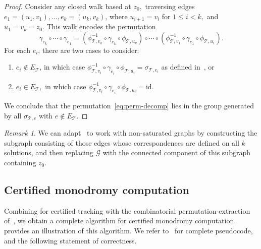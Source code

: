 \documentclass[11pt]{amsart}
\theoremstyle{definition}
\theoremstyle{remark}
\newtheorem{remark}[definition]{Remark}
\begin{document}
\begin{proof}
Consider any closed walk based at $z_0,$ traversing edges $e_1=(u_1, v_1), \dots , e_k=(u_k, v_k)$, where $u_{i+1}=v_i$ for $1\le i <k,$ and $u_1 = v_k = z_0.$
This walk encodes the permutation
\begin{equation}\label{eq:perm-decomp}
\gamma_{e_k} \circ \cdots \circ \gamma_{e_1} 
=
\left( 
\phi_{\mathcal{T},v_k}^{-1}\circ  \gamma_{e_k} \circ \phi_{\mathcal{T},u_k}
\right)
\circ \cdots 
\circ
\left( 
\phi_{\mathcal{T},v_1}^{-1}\circ  \gamma_{e_1}\circ  \phi_{\mathcal{T},u_1}
\right)
.
\end{equation}
For each $e_i$, there are two cases to consider:
\begin{enumerate}
    \item $e_i \notin E_\mathcal{T}$, in which case  $\phi_{\mathcal{T},v_i}^{-1}\circ  \gamma_{e_i} \circ \phi_{\mathcal{T},u_i}= \sigma_{\mathcal{T},e_i}$ as defined in~, or 
    
    \item $e_i\in E_\mathcal{T},$ in which case $\phi_{\mathcal{T},v_i}^{-1}\circ  \gamma_{e_i} \circ \phi_{\mathcal{T},u_i}=\text{id}.$
\end{enumerate}
We conclude that the permutation~\eqref{eq:perm-decomp} lies in the group generated by all $\sigma_{\mathcal{T},e}$ with $e\notin E_\mathcal{T}.$
\end{proof}

\begin{remark}
We can adapt~ to work with non-saturated graphs by constructing the subgraph consisting of those edges whose correspondences are defined on all $k$ solutions, and then replacing $\mathcal{G}$ with the connected component of this subgraph containing $z_0$.
\end{remark}

\subsection{Certified monodromy computation}


Combining  for certified tracking with the combinatorial permutation-extraction of~, we obtain a complete algorithm for certified monodromy computation. 
 provides an illustration of this algorithm.
We refer to~ for complete pseudocode, and the following statement of correctness.
\end{document}

